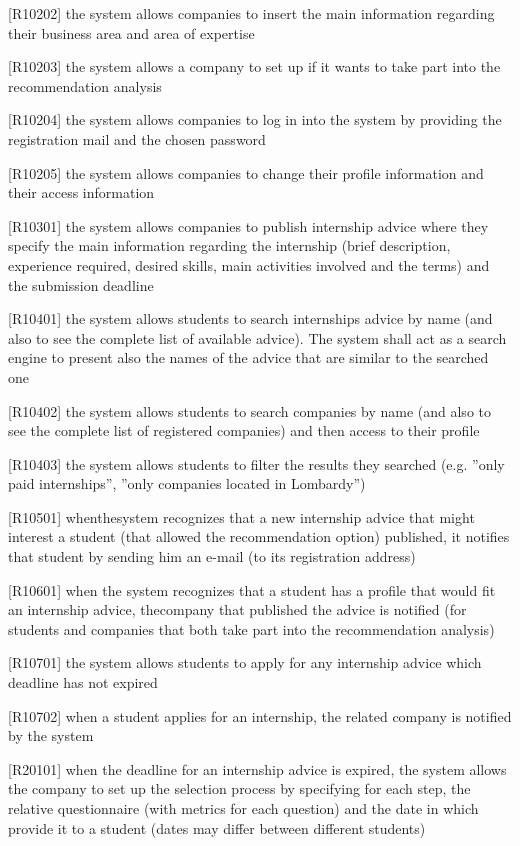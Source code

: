 		[R10202] the system allows companies to insert the main information regarding their business area and area of expertise
		
		[R10203] the system allows a company to set up if it wants to take part into the recommendation analysis
		
		[R10204] the system allows companies to log in into the system by providing the registration mail and the chosen password
		
		[R10205] the system allows companies to change their profile information and their access information
		
		[R10301] the system allows companies to publish internship advice where they specify the main information regarding the internship (brief description, experience required, desired skills, main activities involved and the terms) and the submission deadline
		
		[R10401] the system allows students to search internships advice by name (and also to see the complete list of available advice). The system shall act as a search engine to present also the names of the advice that are similar to the searched one
		
		[R10402] the system allows students to search companies by name (and also to see the complete list of registered companies) and then access to their profile
		
		[R10403] the system allows students to filter the results they searched (e.g. ”only paid internships”, ”only companies located in Lombardy”)
		
		[R10501] whenthesystem recognizes that a new internship advice that might interest a student (that allowed the recommendation option) published, it notifies that student by sending him an e-mail (to its registration address)
		
		[R10601] when the system recognizes that a student has a profile that would fit an internship advice, thecompany that published the advice is notified (for students and companies that both take part into the recommendation analysis)
		
		[R10701] the system allows students to apply for any internship advice which deadline has not expired
		
		[R10702] when a student applies for an internship, the related company is notified by the system
		
		[R20101] when the deadline for an internship advice is expired, the system allows the company to set up the selection process by specifying for each step, the relative questionnaire (with metrics for each question) and the date in which provide it to a student (dates may differ between different students)
		
